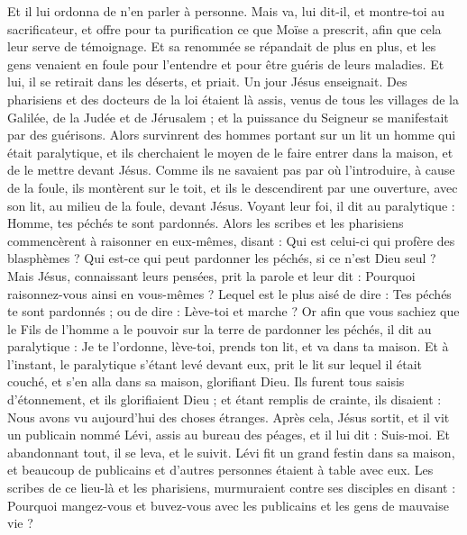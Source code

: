 \begin{multicols}{2}
Et il lui ordonna de n’en parler à personne. Mais va, lui dit-il, et montre-toi au sacrificateur, et offre pour ta purification ce que Moïse a prescrit, afin que cela leur serve de témoignage.
Et sa renommée se répandait de plus en plus, et les gens venaient en foule pour l’entendre et pour être guéris de leurs maladies.
Et lui, il se retirait dans les déserts, et priait.
Un jour Jésus enseignait. Des pharisiens et des docteurs de la loi étaient là assis, venus de tous les villages de la Galilée, de la Judée et de Jérusalem ; et la puissance du Seigneur se manifestait par des guérisons.
Alors survinrent des hommes portant sur un lit un homme qui était paralytique, et ils cherchaient le moyen de le faire entrer dans la maison, et de le mettre devant Jésus.
Comme ils ne savaient pas par où l’introduire, à cause de la foule, ils montèrent sur le toit, et ils le descendirent par une ouverture, avec son lit, au milieu de la foule, devant Jésus.
Voyant leur foi, il dit au paralytique : Homme, tes péchés te sont pardonnés.
Alors les scribes et les pharisiens commencèrent à raisonner en eux-mêmes, disant : Qui est celui-ci qui profère des blasphèmes ? Qui est-ce qui peut pardonner les péchés, si ce n’est Dieu seul ?
Mais Jésus, connaissant leurs pensées, prit la parole et leur dit : Pourquoi raisonnez-vous ainsi en vous-mêmes ?
Lequel est le plus aisé de dire : Tes péchés te sont pardonnés ; ou de dire : Lève-toi et marche ?
Or afin que vous sachiez que le Fils de l'homme a le pouvoir sur la terre de pardonner les péchés, il dit au paralytique : Je te l’ordonne, lève-toi, prends ton lit, et va dans ta maison.
Et à l'instant, le paralytique s'étant levé devant eux, prit le lit sur lequel il était couché, et s'en alla dans sa maison, glorifiant Dieu.
Ils furent tous saisis d'étonnement, et ils glorifiaient Dieu ; et étant remplis de crainte, ils disaient : Nous avons vu aujourd’hui des choses étranges.
Après cela, Jésus sortit, et il vit un publicain nommé Lévi, assis au bureau des péages, et il lui dit : Suis-moi.
Et abandonnant tout, il se leva, et le suivit.
Lévi fit un grand festin dans sa maison, et beaucoup de publicains et d’autres personnes étaient à table avec eux.
Les scribes de ce lieu-là et les pharisiens, murmuraient contre ses disciples en disant : Pourquoi mangez-vous et buvez-vous avec les publicains et les gens de mauvaise vie ?

\end{multicols}
